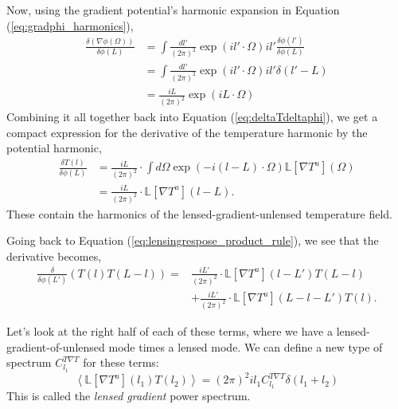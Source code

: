 Now, using the gradient potential's harmonic expansion in Equation (\ref{eq:gradphi_harmonics}),
\begin{align}
  \frac{\delta (\nabla \phi(\Omega))}{\delta \phi(L)}  &= \int \frac{dl'}{(2\pi)^2} \exp(il' \cdot \Omega) il' \frac{\delta \phi(l')}{\delta \phi(L)} \\ \nonumber
  &=   \int \frac{dl'}{(2\pi)^2} \exp(il' \cdot \Omega) il' \delta(l' - L) \\ \nonumber
  &= \frac{iL}{(2\pi)^2} \exp(iL \cdot \Omega)
\end{align}
Combining it all together back into Equation (\ref{eq:deltaTdeltaphi}), we get a compact expression for the derivative of the temperature harmonic by the potential harmonic,
\begin{align}
  \frac{\delta T(l)}{\delta \phi(L)} &= \frac{iL}{(2\pi)^2} \cdot \int d\Omega \exp(-i(l-L) \cdot \Omega) \mathbb{L}[\nabla T^u](\Omega) \\ \nonumber
  &= \frac{iL}{(2\pi)^2} \cdot \mathbb{L}[\nabla T^u](l-L).
\end{align}
These contain the harmonics of the lensed-gradient-unlensed temperature field.

Going back to Equation (\ref{eq:lensingrespose_product_rule}), we see that the derivative becomes,
\begin{align}
  \frac{\delta}{\delta \phi(L')} \left(  T(l) T(L-l)  \right) = &\frac{iL'}{(2\pi)^2} \cdot \mathbb{L}[\nabla T^u](l-L') T(L-l) \\ \nonumber
  &+ \frac{iL'}{(2\pi)^2} \cdot \mathbb{L}[\nabla T^u](L-l-L') T(l).
\end{align}

Let's look at the right half of each of these terms, where we have a lensed-gradient-of-unlensed mode times a lensed mode.
We can define a new type of spectrum $C_{l_1}^{T\nabla T}$ for these terms:
\begin{equation}
   \left\langle \mathbb{L}[\nabla T^u](l_1) T(l_2) \right\rangle =  (2\pi)^2 il_1 C_{l_1}^{T\nabla T} \delta(l_1 + l_2)
\end{equation}
This is called the \textit{lensed gradient} power spectrum.

